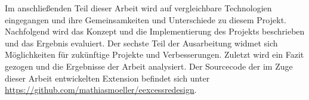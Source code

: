 Im anschließenden Teil dieser Arbeit wird auf vergleichbare Technologien eingegangen und ihre Gemeinsamkeiten und Unterschiede zu diesem Projekt. Nachfolgend wird das Konzept und die Implementierung des Projekts beschrieben und das Ergebnis evaluiert. Der sechste Teil der Ausarbeitung widmet sich Möglichkeiten für zukünftige Projekte und Verbesserungen. Zuletzt wird ein Fazit gezogen und die Ergebnisse der Arbeit analysiert. Der Sourcecode der im Zuge dieser Arbeit entwickelten Extension befindet sich unter \url{https://github.com/mathiasmoeller/eexcessredesign}.